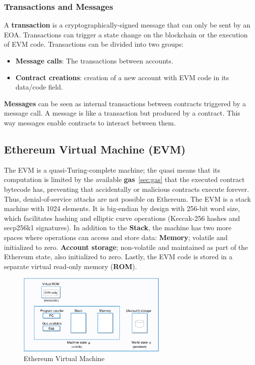 \documentclass[11pt,a4paper]{report}
\begin{document}
\subsubsection{Transactions and Messages}
A \textbf{transaction} is a cryptographically-signed message that can only be sent by an EOA. Transactions can trigger a state change on the blockchain or the execution of EVM code. Transactions can be divided into two groups:
\begin{itemize}
	\item  \textbf{Message calls}: The transactions between accounts.
	\item \textbf{Contract creations}: creation of a new account with EVM code in its data/code field.
\end{itemize}
\textbf{Messages} can be seen as internal transactions between contracts triggered by a message call. A message is like a transaction but produced by a contract. This way messages enable contracts to interact between them.
\subsection{Ethereum Virtual Machine (EVM)}\label{sec:evm}
The EVM\cite{wood2014ethereum}\cite{book:masteringETH-evm} is a quasi-Turing-complete machine; the quasi means that its computation is limited by the available \textbf{gas}~\ref{sec:gas} that the executed contract bytecode has, preventing that accidentally or malicious contracts execute forever. Thus, denial-of-service attacks are not possible on Ethereum. The EVM is a stack machine with 1024 elements. It is big-endian by design with 256-bit word size, which facilitates hashing and elliptic curve operations (Keccak-256 hashes and secp256k1 signatures). In addition to the {\textbf{Stack}}, the machine has two more  spaces where operations can access and store data: {\textbf{Memory}}; volatile and initialized to zero. \textbf{Account storage}; non-volatile and maintained as part of the Ethereum state, also initialized to zero. Lastly, the EVM code is stored in a separate virtual read-only memory (\textbf{ROM}).
\begin{figure}[htp]
	\centering
	\includegraphics[width=0.65\textwidth]{./images/evm}
	\caption{Ethereum Virtual Machine\cite{evm-illustrate}}
	\label{fig:accounts}
\end{figure}
\end{document}
